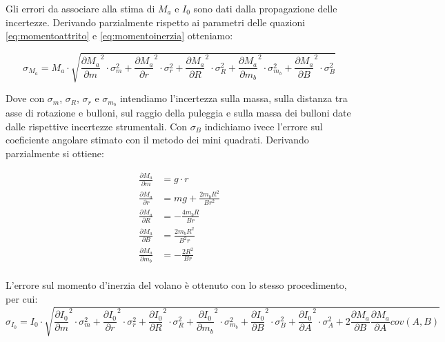 \documentclass[10pt,oneside,a4paper]{article}
\begin{document}
Gli errori da associare alla stima di $M_a$ e $I_0$ sono dati dalla propagazione delle incertezze. Derivando parzialmente rispetto ai parametri delle quazioni \ref{eq:momentoattrito} e \ref{eq:momentoinerzia} otteniamo:

\begin{equation}\label{eq:incertezzamomentoattrito}
\sigma_{M_a}= M_a \cdot \sqrt{ \frac {\partial{M_a}}{ \partial m} ^2 \cdot \sigma_m^2 + \frac {\partial{M_a}}{ \partial r} ^2 \cdot \sigma_r^2 + \frac {\partial{M_a}}{ \partial R} ^2 \cdot \sigma_R^2 + \frac {\partial{M_a}}{ \partial m_b} ^2 \cdot \sigma_{m_b}^2 + \frac {\partial{M_a}}{ \partial B} ^2 \cdot \sigma_{B}^2 }
\end{equation}

Dove con $\sigma_m$,  $\sigma_R$, $\sigma_r$ e $\sigma_{m_b}$ intendiamo l'incertezza sulla massa, sulla distanza tra asse di rotazione e bulloni, sul raggio della puleggia e sulla massa dei bulloni date dalle rispettive incertezze strumentali. Con $\sigma_B$ indichiamo ivece l'errore sul coeficiente angolare stimato con il metodo dei mini quadrati. \newline
Derivando parzialmente si ottiene:

\begin{align*}\label{eq:parziali}
\frac{\partial{M_a}}{ \partial m} &=g\cdot r \\
\frac{\partial{M_a}}{ \partial r} &=mg + \frac{2m_b R^2}{Br^2}\\
\frac{\partial{M_a}}{ \partial R} &=-\frac{4m_bR}{Br} \\
\frac{\partial{M_a}}{ \partial B} &=\frac{2m_b R^2}{B^2 r}\\
\frac{\partial{M_a}}{ \partial m_b} &=-\frac{2R^2}{Br} \\
\end{align*}


L'errore sul momento d'inerzia del volano è ottenuto con lo stesso procedimento, per cui: 
\begin{equation}\label{eq:incertezzamomentoinerzia}
\sigma_{I_0} = I_0 \cdot \sqrt{ \frac {\partial{I_0}}{ \partial m} ^2 \cdot \sigma_m^2 + \frac {\partial{I_0}}{ \partial r} ^2 \cdot \sigma_r^2 + \frac {\partial{I_0}}{ \partial R} ^2 \cdot \sigma_R^2 + \frac {\partial{I_0}}{ \partial m_b} ^2 \cdot \sigma_{m_b}^2+ \frac {\partial{I_0}}{\partial B} ^2 \cdot \sigma_{B}^2 + \frac {\partial{I_0}}{\partial A} ^2 \cdot \sigma_{A}^2 + 2 \frac{\partial M_a}{\partial B} \frac{\partial M_a}{\partial A} cov(A, B)}
\end{equation} 
\end{document}
